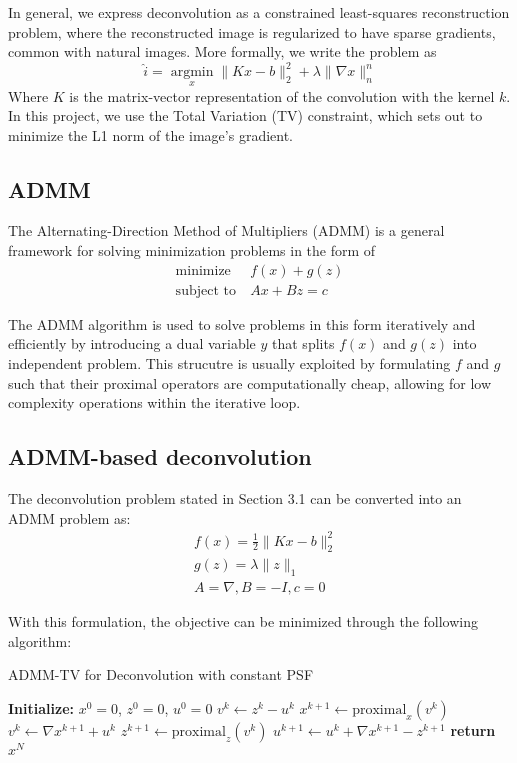 \documentclass[sigconf]{acmart}
\begin{document}
In general, we express deconvolution as a constrained least-squares reconstruction problem, where the reconstructed image is regularized to have sparse gradients, common with natural images. More formally, we write the problem as 
$$\hat{i} = \mathop{\mathrm{argmin}}\limits_{x}\|Kx-b\|_2^2 + \lambda\|\nabla x\|_n^n $$
Where $K$ is the matrix-vector representation of the convolution with the kernel $k$. 
In this project, we use the Total Variation (TV) constraint, which sets out to minimize the L1 norm of the image's gradient.
\subsection{ADMM}
The Alternating-Direction Method of Multipliers (ADMM) is a general framework for solving minimization problems in the form of
\begin{align*}
    \text{minimize}~~ &f(x) + g(z)\\
    \text{subject to}~ &Ax + Bz = c
\end{align*}

The ADMM algorithm is used to solve problems in this form iteratively and efficiently by introducing a dual variable $y$ that splits $f(x)$ and $g(z)$ into independent problem. This strucutre is usually exploited by formulating $f$ and $g$ such that their proximal operators are computationally cheap, allowing for low complexity operations within the iterative loop.

\subsection{ADMM-based deconvolution}
The deconvolution problem stated in Section 3.1 can be converted into an ADMM problem as:
\begin{align*}
    &f(x) = \frac{1}{2}\|Kx - b\|_2^2 \\
    &g(z) = \lambda \|z \|_1\\
    &A = \nabla, B=-I, c=0
\end{align*}

With this formulation, the objective can be minimized through the following algorithm: 
\begin{algorithm}
\caption{ADMM-TV for Deconvolution with constant PSF}
\begin{algorithmic}[1]
\State \textbf{Initialize:} $x^0 = 0$, $z^0 = 0$, $u^0 = 0$
    \State $v^k \leftarrow z^k - u^k$
    \State $x^{k+1} \leftarrow \text{proximal}_x(v^k)$
    \State $v^k \leftarrow \nabla x^{k+1} + u^k$
    \State $z^{k+1} \leftarrow \text{proximal}_z(v^k)$
    \State $u^{k+1} \leftarrow u^k + \nabla x^{k+1} - z^{k+1}$
\EndFor
\State \textbf{return} $x^N$
\end{algorithmic}
\end{algorithm}
\end{document}
